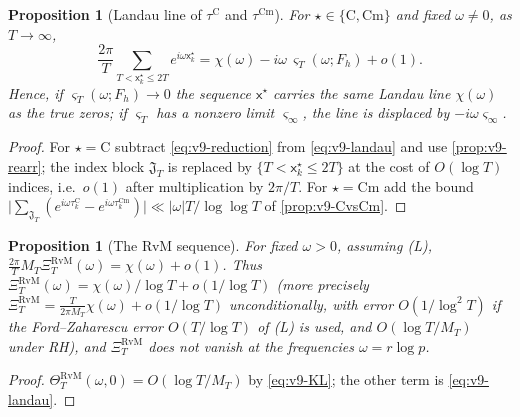 \documentclass[11pt,a4paper]{article}
\numberwithin{equation}{section}
\newtheorem{proposition}[theorem]{Proposition}
\theoremstyle{definition}
\theoremstyle{remark}
\newcommand{\Cm}{\mathrm{Cm}}
\begin{document}
\begin{proposition}[Landau line of $\tau^{\mathrm C}$ and $\tau^{\Cm}$]\label{prop:v9-line}
For $\star\in\{\mathrm C,\Cm\}$ and fixed $\omega\ne0$, as $T\to\infty$,
\begin{equation}\label{eq:v9-line}
\frac{2\pi}{T}\sum_{T<\mathsf x_k^\star\le2T}e^{i\omega\mathsf x_k^\star}=\chi(\omega)-i\omega\,\varsigma_T(\omega;F_h)+o(1).
\end{equation}
Hence, if $\varsigma_T(\omega;F_h)\to0$ the sequence $\mathsf x^\star$ carries the same Landau line $\chi(\omega)$ as the true zeros; if $\varsigma_T$ has a nonzero limit $\varsigma_\infty$, the line is displaced by $-i\omega\varsigma_\infty$.
\end{proposition}
\begin{proof}
For $\star=\mathrm C$ subtract \eqref{eq:v9-reduction} from \eqref{eq:v9-landau} and use \cref{prop:v9-rearr}; the index block $\mathfrak J_T$ is replaced by $\{T<\mathsf x_k^\star\le2T\}$ at the cost of $O(\log T)$ indices, i.e.\ $o(1)$ after multiplication by $2\pi/T$. For $\star=\Cm$ add the bound $\bigl|\sum_{\mathfrak J_T}(e^{i\omega\tau_k^{\mathrm C}}-e^{i\omega\tau_k^{\Cm}})\bigr|\ll|\omega|T/\log\log T$ of \cref{prop:v9-CvsCm}.
\end{proof}

\begin{proposition}[The RvM sequence]\label{prop:v9-rvm}
For fixed $\omega>0$, assuming (L), $\frac{2\pi}T M_T\Xi_T^{\mathrm{RvM}}(\omega)=\chi(\omega)+o(1)$. Thus
$\Xi_T^{\mathrm{RvM}}(\omega)=\chi(\omega)/\log T+o(1/\log T)$ (more precisely $\Xi_T^{\mathrm{RvM}}=\frac{T}{2\pi M_T}\chi(\omega)+o(1/\log T)$ unconditionally, with error $O(1/\log^2T)$ if the Ford--Zaharescu error $O(T/\log T)$ of (L) is used, and $O(\log T/M_T)$ under RH), and $\Xi_T^{\mathrm{RvM}}$ does not vanish at the frequencies $\omega=r\log p$.
\end{proposition}
\begin{proof}
$\Theta_T^{\mathrm{RvM}}(\omega,0)=O(\log T/M_T)$ by \eqref{eq:v9-KL}; the other term is \eqref{eq:v9-landau}.
\end{proof}
\end{document}
